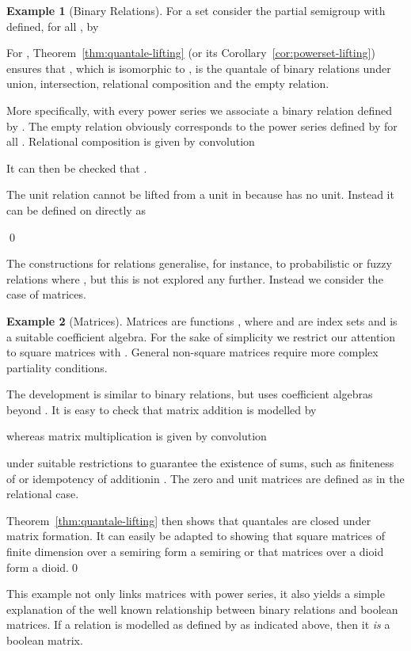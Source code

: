 \documentclass[12pt]{article}
\theoremstyle{definition}
\newtheorem{example}{Example}
\newcommand{\refthm}[1]{Theorem~\ref{#1}}
\begin{document}
\begin{example}[Binary Relations]\label{ex:binary-relations}
  For a set  consider the partial semigroup 
  with  defined, for all , by
  
For , Theorem~\ref{thm:quantale-lifting} (or its
Corollary~\ref{cor:powerset-lifting}) ensures that
, which is isomorphic to
, is the quantale of binary relations
under union, intersection, relational composition and the empty
relation.

More specifically, with every power series  we associate a binary
relation  defined by . The empty relation  obviously corresponds to the
power series defined by  for all . Relational
composition is given by convolution

It can then be checked  that .

The unit relation cannot be lifted from a unit in  because
 has no unit. Instead it can be defined on
 directly as

\qed
\end{example}

The constructions for relations generalise, for instance, to
probabilistic or fuzzy relations where , but this is
not explored any further. Instead we consider the case of matrices.

\begin{example}[Matrices]\label{ex:matrices}
  Matrices are functions , where  and 
  are index sets and  is a suitable coefficient algebra. For the
  sake of simplicity we restrict our attention to square matrices with
  . General non-square matrices require more complex
  partiality conditions.

  The development is similar to binary relations, but uses coefficient
  algebras beyond . It is easy to check that matrix
  addition is modelled by

whereas matrix multiplication is given by
convolution

under suitable restrictions to guarantee the existence of sums, such
as finiteness of  or idempotency of additionin . The zero and
unit matrices are defined as in the relational case.

\refthm{thm:quantale-lifting} then shows that quantales are closed
under matrix formation. It can easily be adapted to showing that square
matrices of finite dimension over a semiring form a semiring or that
matrices over a dioid form a dioid.\qed
\end{example}

This example not only links matrices with  power series, it also
yields a simple explanation of the well known relationship between
binary relations and boolean matrices. If a relation  is modelled as  defined by
 as indicated above, then it
\emph{is} a boolean matrix.
\end{document}
